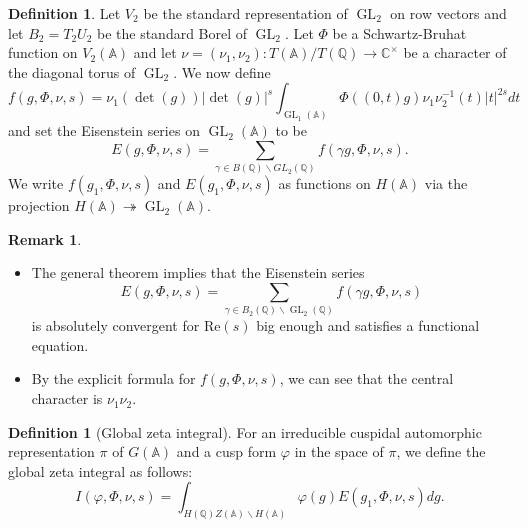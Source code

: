 \documentclass[11pt, a4paper]{amsart}
\theoremstyle{plain}
\theoremstyle{definition}
\newtheorem{definition}[theorem]{Definition}
\newtheorem{remark}[theorem]{Remark}
\numberwithin{equation}{section}
\def\AAA{\mathbb{A}}
\def\CC{\mathbb{C}}
\def\QQ{\mathbb{Q}}
\DeclareMathOperator{\GL}{\mathrm{GL}}
\begin{document}
\begin{definition}
    Let $V_{2}$ be the standard representation of $\GL_2$ on row vectors and let $B_2 = T_2U_2$ be the standard Borel of $\GL_2$. Let $\Phi$ be a Schwartz-Bruhat function on $V_{2}(\AAA)$ and let $\nu = (\nu_1, \nu_2) \colon T(\AAA)/T(\QQ) \rightarrow \CC^{\times}$ be a character of the diagonal torus of $\GL_2$. We now define
    \begin{equation*}
        f(g, \Phi, \nu, s) = \nu_{1}(\det(g))|\det(g)|^{s} \int_{\GL_1(\AAA)} \Phi((0, t)g) \nu_1\nu_2^{-1}(t) |t|^{2s} dt
    \end{equation*}
    and set the Eisenstein series on $\GL_2(\AAA)$ to be 
    \begin{equation*}
        E(g, \Phi, \nu, s) = \sum\limits_{\gamma \in B(\QQ)\backslash GL_2(\QQ)} f(\gamma g, \Phi, \nu,s). 
    \end{equation*}
    We write $f(g_1, \Phi, \nu, s)$ and $E(g_1, \Phi, \nu, s)$ as functions on $H(\AAA)$ via the projection $H(\AAA) \twoheadrightarrow \GL_2(\AAA)$. 
\end{definition}
\begin{remark}
    \begin{itemize}
        \item The general theorem \cite[Lemma 4.1]{Langlands76} implies that the Eisenstein series 
        \begin{equation*}
            E(g, \Phi, \nu, s) = \sum\limits_{\gamma \in B_{2}(\QQ)\backslash \GL_2(\QQ)} f(\gamma g, \Phi, \nu, s)
        \end{equation*}
        is absolutely convergent for $\mathrm{Re}(s)$ big enough and satisfies a functional equation. 
        \item By the explicit formula for $f(g, \Phi, \nu, s)$, we can see that the central character is $\nu_1\nu_2$.
    \end{itemize}
\end{remark}

\begin{definition}[Global zeta integral]
\label{def: Zeta_integral}
    For an irreducible cuspidal automorphic representation $\pi$ of $G(\AAA)$ and a cusp form $\varphi$ in the space of $\pi$, we define the global zeta integral as follows: 
    \begin{equation*}
        I(\varphi, \Phi, \nu, s) = \int_{H(\QQ)Z(\AAA) \backslash H(\AAA)} \varphi(g) E(g_1, \Phi, \nu, s) dg. 
    \end{equation*}
\end{definition}
\end{document}
